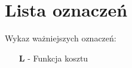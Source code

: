 \chapter{Lista oznaczeń}
\newline
Wykaz ważniejszych oznaczeń:

\begin{itemize}
  \item[$\mathbf{L}$] - Funkcja kosztu
\end{itemize}
